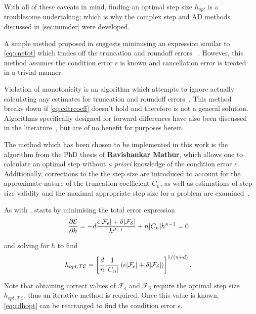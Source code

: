 With all of these caveats in mind, finding an optimal step size $h_{opt}$ is a troublesome undertaking; which is why the complex step and AD methods discussed in \cref{sec:numder} were developed.

A simple method proposed in \citeauthor{Gill1982} suggests minimising an expression similar to \cref{eq:cnetot} which trades off the truncation and roundoff errors ~\cite{Gill1982,Mathews2004}.
However, this method assumes the condition error $\epsilon$ is known and cancellation error is treated in a trivial manner.

Violation of monotonicity is an algorithm which attempts to ignore actually calculating any estimates for truncation and roundoff errors~\cite{Stepleman1979}. This method breaks down if \cref{eq:cdtrcoeff} doesn't hold and therefore is not a general solution.
Algorithms specifically designed for forward differences have also been discussed in the literature~\cite{Barton1992}, but are of no benefit for purposes herein.

The method which has been chosen to be implemented in this work is the algorithm from the PhD thesis of \textbf{Ravishankar Mathur}, which allows one to calculate an optimal step without \textit{a priori} knowledge of the condition error $\epsilon$.
Additionally, corrections to the the step size are introduced to account for the approximate nature of the truncation coefficient $C_n$, as well as estimations of step size validity and the maximal appropriate step size for a problem are examined~\cite{Mathur2012}.

As with \citeauthor{Gill1982}, \citeauthor{Mathur2012} starts by minimising the total error expression
\begin{equation}
\frac{\partial\mathcal{E}}{\partial h} = -d\frac{\epsilon\lvert\mathcal{F}_\epsilon\rvert+\delta\lvert\mathcal{F}_\delta\rvert}{h^{d+1}} + n\lvert C_n\rvert h^{n-1} = 0
\end{equation}

and solving for $h$ to find
\begin{equation}
h_{opt,\mathcal{TE}} = \left[\frac{d}{n}\frac{1}{\lvert C_n\rvert}\left(\epsilon\lvert\mathcal{F}_\epsilon\rvert+
\delta\lvert\mathcal{F}_\delta\rvert\right)\right]^{1/(n+d)}.\label{eq:cdhopt}
\end{equation}

Note that obtaining correct values of $\mathcal{F}_\epsilon$ and $\mathcal{F}_\delta$ require the optimal step size $h_{opt,\mathcal{TE}}$, thus an iterative method is required.
Once this value is known, \cref{eq:cdhopt} can be rearranged to find the condition error $\epsilon$.

